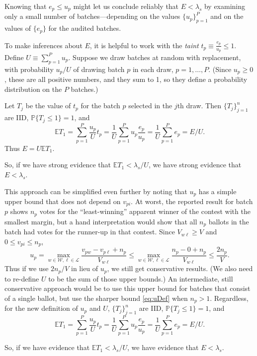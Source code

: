 Knowing that $e_p \le u_p$ might let us conclude reliably that $E < \lambda_s$
by examining only a small number of batches---depending on the 
values $\{ u_p\}_{p=1}^P$ and on the values of $\{e_p\}$ for the audited batches.

To make inferences about $E$, it is helpful to work with the \emph{taint} 
$t_p \equiv \frac{e_p}{u_p} \le 1$.
Define $U \equiv \sum_{p=1}^P u_p$.
Suppose we draw batches at random with replacement, with probability $u_p/U$
of drawing batch $p$ in each draw, $p = 1, \ldots, P$.
(Since $u_p \ge 0$, these are all positive numbers, and they sum to 1,
so they define a probability distribution on the $P$ batches.)

Let $T_j$ be the value of $t_p$ for the batch $p$ selected in the $j$th draw.
Then $\{T_j\}_{j=1}^n$ are IID, $\mathbb{P} \{T_j \le 1\} = 1$, and
$$
  \mathbb{E} T_1 = \sum_{p=1}^P \frac{u_p}{U} t_p =
  \frac{1}{U}\sum_{p=1}^P u_p \frac{e_p}{u_p} = 
  \frac{1}{U} \sum_{p=1}^P e_p = E/U.
$$
Thus $E = U \mathbb{E} T_1$. 

So, if we have strong evidence that
$\mathbb{E} T_1 < \lambda_s/U$, we have
strong evidence that $E < \lambda_s$.

This approach can be simplified even further by noting that $u_p$ has
a simple upper bound that does not depend on $v_{pi}$.
At worst, the reported result for batch $p$ shows $n_p$ votes for the 
``least-winning'' apparent winner of the contest with the smallest margin, 
but a hand interpretation would show that all $n_p$ ballots in the batch 
had votes for the runner-up in that contest.
Since $V_{w\ell} \ge V$ and $0 \le v_{pi} \le n_p$,
$$ 
    u_p =  \max_{w \in \mathcal{W}, \ell \in \mathcal{L}} 
    \frac{v_{pw} - v_{p\ell} + n_p}{V_{w\ell}}
    \le  \max_{w \in \mathcal{W}, \ell \in \mathcal{L}} 
    \frac{n_p - 0 + n_p}{V_{w\ell}}
    \le \frac{2n_p}{V}.
$$
Thus if we use $2n_p/V$ in lieu of $u_p$, we still get conservative results.
(We also need to re-define $U$ to be the sum of those upper bounds.)
An intermediate, still conservative approach would be to use this upper bound for
batches that consist of a single ballot, but use the sharper bound \ref{eq:uDef}
when $n_p > 1$.
Regardless, for the new definition of $u_p$ and $U$,
$\{T_j\}_{j=1}^n$ are IID, $\mathbb{P} \{T_j \le 1\} = 1$,
and
$$
  \mathbb{E} T_1 = \sum_{p=1}^P \frac{u_p}{U} t_p =
  \frac{1}{U}\sum_{p=1}^P u_p \frac{e_p}{u_p} = 
  \frac{1}{U} \sum_{p=1}^P e_p = E/U.
$$

So, if we have evidence that $\mathbb{E} T_1 < \lambda_s/U$, we have evidence that 
$E < \lambda_s$.

